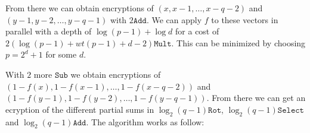 From there we can obtain encryptions of $(x,x-1,\ldots, x-q-2)$ and $(y-1,y-2,\ldots, y-q-1)$ with $2\texttt{Add}$. We can apply $f$ to these vectors in parallel with a depth of $\log (p-1) + \log d$ for a cost of $2(\log (p-1) + wt(p-1) + d - 2) \texttt{Mult}$. This can be minimized by choosing $p = 2^d + 1$ for some $d$.

With $2$ more $\texttt{Sub}$ we obtain encryptions of $(1-f(x), 1-f(x-1), \ldots, 1-f(x-q-2))$ and $(1-f(y-1), 1-f(y-2), \ldots, 1-f(y-q-1))$. From there we can get an ecryption of the different partial sums in $\log_2(q-1)\texttt{Rot}$, $\log_2(q-1)\texttt{Select}$ and $\log_2(q-1)\texttt{Add}$. The algorithm works as follow:

\begin{center}
\end{center}
